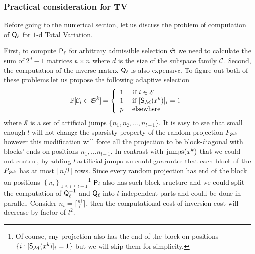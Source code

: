 \subsubsection{Practical consideration for TV}
{\color{blue}
Before going to the numerical section, let us discuss the problem of computation of ${\mathsf{Q}}_\ell$ for $1$-d Total Variation.

First, to compute ${\mathsf{P}}_\ell$ for arbitrary admissible selection $\mathfrak{S}$ we need to calculate the sum of $2^d - 1$ matrices $n\times n$ where $d$ is the size of the subspace family $\mathcal{C}$. Second, the computation of the inverse matrix ${\mathsf{Q}}_\ell$ is also expensive. To figure out both of these problems let us propose the following adaptive selection 
$$
\mathbb{P}[\mathcal{C}_i\in\mathfrak{S}^k] = 
\left\{
    \begin{array}{rl}
        1 &  \text{ if } i\in\mathcal{S} \\
        1 &  \text{ if } [\mathsf{S}_{\mathcal{M}}(x^k)]_i = 1\\
        p & \text{ elsewhere } 
    \end{array}\right.
$$
where $\mathcal{S}$ is a set of artificial jumps $\{n_1, n_2, \ldots, n_{l-1}\}$. It is easy to see that small enough $l$ will not change the sparsisty property of the random projection $P_{\mathfrak{S}^k}$ however this modification will force all the projection to be block-diagonal with blocks' ends on positions $n_1,\ldots n_{l-1}$. In contrast with $\mathrm{jumps}(x^k)$ that we could not control, by adding $l$ artificial jumps we could guarantee that each block of the $P_{\mathfrak{S}^k}$ has at most $\lceil n/l\rceil$ rows. Since every random projection has end of the block on positions $\left\{n_i\right\}_{1\leq i \leq l -1}$\footnote{Of course, any projection also has the end of the block on positions $\{i:[\mathsf{S}_{\mathcal{M}}(x^k)]_i = 1\}$ but we will skip them for simplicity.} ${\mathsf{P}}_\ell$ also has such block sructure and we could split the computation of ${\mathsf{Q}}_\ell^{-1}$ and ${\mathsf{Q}}_\ell$ into $l$ independent parts and could be done in parallel. Consider $n_i = \lceil
\frac{ni}{l}\rceil$, then the computational cost of inversion cost will decrease by factor of $l^2$.
}